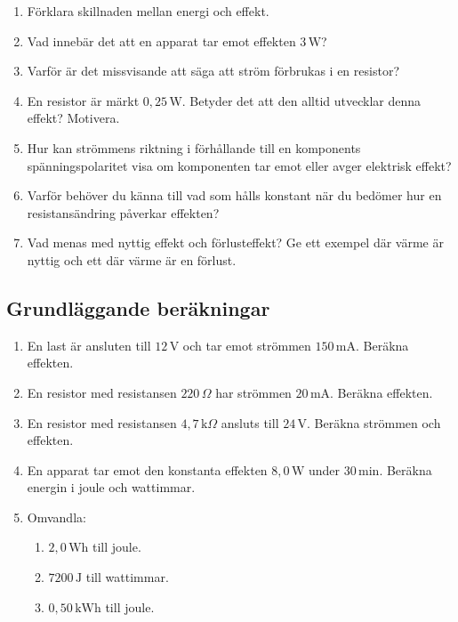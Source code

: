 \documentclass[
  swedish,
  11pt,
  a4paper,
  DIV=11,
  numbers=noendperiod,
  twoside,
  open=any]{scrreprt}
\begin{document}
\begin{enumerate}
\def\labelenumi{\arabic{enumi}.}
\item
  Förklara skillnaden mellan energi och effekt.
\item
  Vad innebär det att en apparat tar emot effekten \(3\,\mathrm{W}\)?
\item
  Varför är det missvisande att säga att ström förbrukas i en resistor?
\item
  En resistor är märkt \(0{,}25\,\mathrm{W}\). Betyder det att den
  alltid utvecklar denna effekt? Motivera.
\item
  Hur kan strömmens riktning i förhållande till en komponents
  spänningspolaritet visa om komponenten tar emot eller avger elektrisk
  effekt?
\item
  Varför behöver du känna till vad som hålls konstant när du bedömer hur
  en resistansändring påverkar effekten?
\item
  Vad menas med nyttig effekt och förlusteffekt? Ge ett exempel där
  värme är nyttig och ett där värme är en förlust.
\end{enumerate}

\subsection{Grundläggande
beräkningar}\label{sec-effekt-grundlaggande-berakningar}

\begin{enumerate}
\def\labelenumi{\arabic{enumi}.}
\setcounter{enumi}{7}
\item
  En last är ansluten till \(12\,\mathrm{V}\) och tar emot strömmen
  \(150\,\mathrm{mA}\). Beräkna effekten.
\item
  En resistor med resistansen \(220\,\Omega\) har strömmen
  \(20\,\mathrm{mA}\). Beräkna effekten.
\item
  En resistor med resistansen \(4{,}7\,\mathrm{k}\Omega\) ansluts till
  \(24\,\mathrm{V}\). Beräkna strömmen och effekten.
\item
  En apparat tar emot den konstanta effekten \(8{,}0\,\mathrm{W}\) under
  \(30\,\mathrm{min}\). Beräkna energin i joule och wattimmar.
\item
  Omvandla:

  \begin{enumerate}
  \def\labelenumii{\alph{enumii}.}
  \item
    \(2{,}0\,\mathrm{Wh}\) till joule.
  \item
    \(7200\,\mathrm{J}\) till wattimmar.
  \item
    \(0{,}50\,\mathrm{kWh}\) till joule.
  \end{enumerate}
\end{enumerate}
\end{document}

